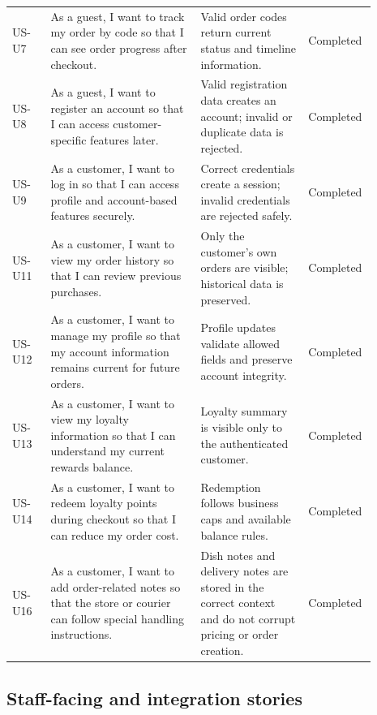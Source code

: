 \begin{longtable}{L{0.10\linewidth} L{0.39\linewidth} L{0.28\linewidth} L{0.12\linewidth}}
US-U7 & As a guest, I want to track my order by code so that I can see order progress after checkout. & Valid order codes return current status and timeline information. & Completed \\
US-U8 & As a guest, I want to register an account so that I can access customer-specific features later. & Valid registration data creates an account; invalid or duplicate data is rejected. & Completed \\
US-U9 & As a customer, I want to log in so that I can access profile and account-based features securely. & Correct credentials create a session; invalid credentials are rejected safely. & Completed \\
US-U11 & As a customer, I want to view my order history so that I can review previous purchases. & Only the customer's own orders are visible; historical data is preserved. & Completed \\
US-U12 & As a customer, I want to manage my profile so that my account information remains current for future orders. & Profile updates validate allowed fields and preserve account integrity. & Completed \\
US-U13 & As a customer, I want to view my loyalty information so that I can understand my current rewards balance. & Loyalty summary is visible only to the authenticated customer. & Completed \\
US-U14 & As a customer, I want to redeem loyalty points during checkout so that I can reduce my order cost. & Redemption follows business caps and available balance rules. & Completed \\
US-U16 & As a customer, I want to add order-related notes so that the store or courier can follow special handling instructions. & Dish notes and delivery notes are stored in the correct context and do not corrupt pricing or order creation. & Completed \\
\end{longtable}
\endgroup

\subsection{Staff-facing and integration stories}

